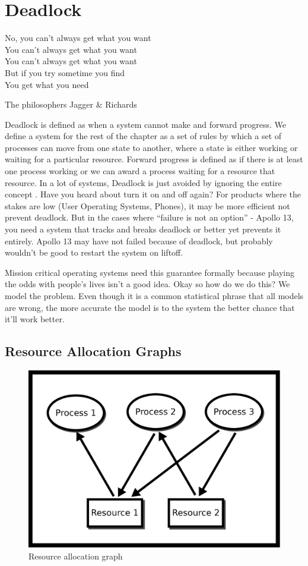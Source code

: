 \chapter{Deadlock}

\epigraph{No, you can't always get what you want
\\You can't always get what you want
\\You can't always get what you want
\\But if you try sometime you find
\\You get what you need}{The philosophers Jagger \& Richards}

\gls{Deadlock} is defined as when a system cannot make and forward progress.
We define a system for the rest of the chapter as a set of rules by which a set of processes can move from one state to another, where a state is either working or waiting for a particular resource.
Forward progress is defined as if there is at least one process working or we can award a process waiting for a resource that resource.
In a lot of systems, Deadlock is just avoided by ignoring the entire concept \cite[P.237]{silberschatz2006operating}.
Have you heard about turn it on and off again?
For products where the stakes are low (User Operating Systems, Phones), it may be more efficient not prevent deadlock.
But in the cases where ``failure is not an option'' - Apollo 13, you need a system that tracks and breaks deadlock or better yet prevents it entirely.
Apollo 13 may have not failed because of deadlock, but probably wouldn't be good to restart the system on liftoff.

Mission critical operating systems need this guarantee formally because playing the odds with people's lives isn't a good idea.
Okay so how do we do this? We model the problem.
Even though it is a common statistical phrase that all models are wrong, the more accurate the model is to the system the better chance that it'll work better.

\section{Resource Allocation Graphs}

\begin{figure}[H]
\centering
\includegraphics[width=.6\textwidth]{deadlock/drawings/rag.eps}
\caption{Resource allocation graph}
\label{ragfigure}
\end{figure}


